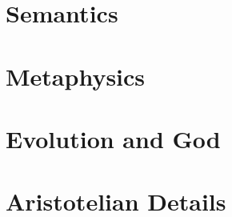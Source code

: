 \chapter{Semantics}\label{ch:semantics}
\chaptertail

\def\mychapter{VI}

\chapter{Metaphysics}\label{ch:metaphysics}
\chaptertail 

\def\mychapter{VII}

\chapter{Evolution and God}\label{ch:God}
\chaptertail

\def\mychapter{VIII}

\chapter{Aristotelian Details}\label{ch:details}
\chaptertail
